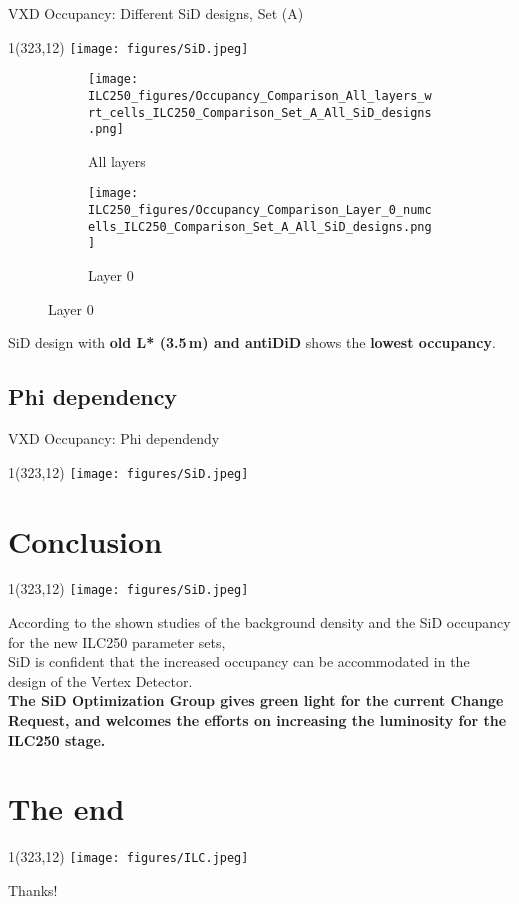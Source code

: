 \documentclass[xcolor={dvipsnames}]{beamer}
\newcommand{\sidlogo}{
  \setlength{\TPHorizModule}{1pt}
  \setlength{\TPVertModule}{1pt}
  \begin{textblock}{1}(323,12)
   \texttt{[image: figures/SiD.jpeg]}
  \end{textblock}
  }
\newcommand{\ilclogo}{
  \setlength{\TPHorizModule}{1pt}
  \setlength{\TPVertModule}{1pt}
  \begin{textblock}{1}(323,12)
   \texttt{[image: figures/ILC.jpeg]}
  \end{textblock}
}
\begin{document}
\begin{frame}{VXD Occupancy: Different SiD designs, Set (A)}
\sidlogo
\begin{figure}
\centering
\begin{subfigure}[t]{0.48\textwidth}
\centering
\texttt{[image: ILC250\_figures/Occupancy\_Comparison\_All\_layers\_wrt\_cells\_ILC250\_Comparison\_Set\_A\_All\_SiD\_designs.png]}
\caption{\alert{All layers}}
 \end{subfigure}
\hspace*{0.2cm}
\begin{subfigure}[t]{0.48\textwidth}
\centering
\texttt{[image: ILC250\_figures/Occupancy\_Comparison\_Layer\_0\_numcells\_ILC250\_Comparison\_Set\_A\_All\_SiD\_designs.png]}
\caption{\alert{Layer 0}}
\end{subfigure}
\end{figure}
\normalsize SiD design with \textbf{old L* (3.5\,m) and antiDiD} shows the \textbf{lowest occupancy}.
\end{frame}

\subsection{Phi dependency}
\begin{frame}{VXD Occupancy: Phi dependendy}
\sidlogo

\end{frame}

\section{Conclusion}
\begin{frame}
\sidlogo
 According to the shown studies of the background density and the SiD occupancy for the new ILC250 parameter sets,\\
 \alert{SiD is confident that the increased occupancy can be accommodated in the design of the Vertex Detector.}\\
 \textbf{The SiD Optimization Group gives green light for the current Change Request, and welcomes the efforts on increasing the luminosity for the ILC250 stage.}
\end{frame}



\section*{The end}
{
\begin{frame}
\ilclogo
\begin{center}
\textcolor{RubineRed}{
	\LARGE Thanks!\\
}
\end{center}
\end{frame}
}
\end{document}

